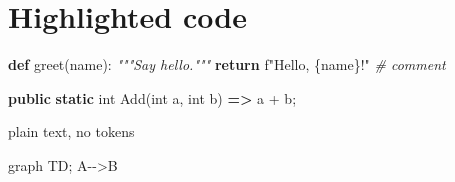 \documentclass[
]{article}
\author{}
\date{}
\newenvironment{Shaded}{}{}
\newcommand{\BuiltInTok}[1]{\textcolor[rgb]{0.00,0.50,0.00}{#1}}
\newcommand{\CommentTok}[1]{\textcolor[rgb]{0.38,0.63,0.69}{\textit{#1}}}
\newcommand{\ControlFlowTok}[1]{\textcolor[rgb]{0.00,0.44,0.13}{\textbf{#1}}}
\newcommand{\DataTypeTok}[1]{\textcolor[rgb]{0.56,0.13,0.00}{#1}}
\newcommand{\FunctionTok}[1]{\textcolor[rgb]{0.02,0.16,0.49}{#1}}
\newcommand{\KeywordTok}[1]{\textcolor[rgb]{0.00,0.44,0.13}{\textbf{#1}}}
\newcommand{\NormalTok}[1]{#1}
\newcommand{\OperatorTok}[1]{\textcolor[rgb]{0.40,0.40,0.40}{#1}}
\newcommand{\StringTok}[1]{\textcolor[rgb]{0.25,0.44,0.63}{#1}}
\newcommand{\VariableTok}[1]{\textcolor[rgb]{0.10,0.09,0.49}{#1}}
\begin{document}
\section{Highlighted code}\label{highlighted-code}

\begin{Shaded}
\begin{Highlighting}[]
\KeywordTok{def} \FunctionTok{greet}\NormalTok{(name):}
    \CommentTok{"""Say hello."""}
    \ControlFlowTok{return} \DataTypeTok{f}\StringTok{"Hello, }\NormalTok{\{name\}}\StringTok{!"}  \CommentTok{\# comment}
\end{Highlighting}
\end{Shaded}

\begin{Shaded}
\end{Shaded}

\begin{Shaded}
\begin{Highlighting}[]
\KeywordTok{public} \KeywordTok{static} \DataTypeTok{int} \FunctionTok{Add}\NormalTok{(}\DataTypeTok{int}\NormalTok{ a, }\DataTypeTok{int}\NormalTok{ b) }\KeywordTok{=\textgreater{}}\NormalTok{ a }\OperatorTok{+}\NormalTok{ b;}
\end{Highlighting}
\end{Shaded}

\begin{Shaded}
\begin{Highlighting}[]
\NormalTok{plain text, no tokens}
\end{Highlighting}
\end{Shaded}

\begin{Shaded}
\begin{Highlighting}[]
\NormalTok{graph TD; A{-}{-}\textgreater{}B}
\end{Highlighting}
\end{Shaded}

\begin{Shaded}
\begin{Highlighting}[]

\end{Highlighting}
\end{Shaded}
\end{document}
